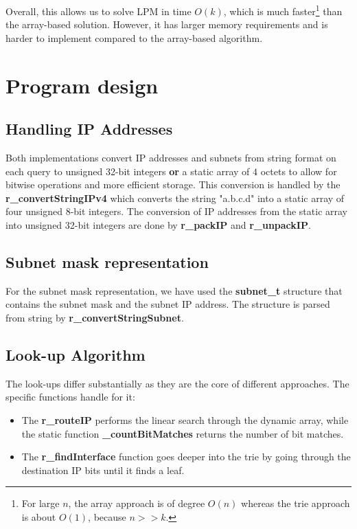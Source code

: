 \documentclass{lpm/adsrprt}
\begin{document}
Overall, this allows us to solve LPM in time $O(k)$, which is much faster\footnote{For large $n$, the array approach is of degree $O(n)$ whereas the trie approach is about $O(1)$, because $n >> k$. } than the array-based solution. However, it has larger memory requirements and is harder to implement compared to the array-based algorithm.

\section{Program design}

\subsection{Handling IP Addresses}

Both implementations convert IP addresses and subnets from string format on each query to unsigned 32-bit integers \textbf{or} a static array of $4$ octets to allow for bitwise operations and more efficient storage. This conversion is handled by the \textbf{r\_convertStringIPv4} which converts the string "a.b.c.d" into a static array of four unsigned 8-bit integers. The conversion of IP addresses from the static array into unsigned 32-bit integers are done by \textbf{r\_packIP} and \textbf{r\_unpackIP}.

\subsection{Subnet mask representation}
For the subnet mask representation, we have used the \textbf{subnet\_t} structure that contains the subnet mask and the subnet IP address. The structure is parsed from string by \textbf{r\_convertStringSubnet}.

\subsection{Look-up Algorithm}
The look-ups differ substantially as they are the core of different approaches.
The specific functions handle for it:
\begin{itemize}
    \item \> The \textbf{r\_routeIP } performs the linear search through the dynamic array, while  the static function \textbf{\_countBitMatches} returns the number of bit matches.
    \item \> The \textbf{r\_findInterface } function goes deeper into the trie by going through the destination IP bits until it finds a leaf. 
\end{itemize} 
\end{document}

